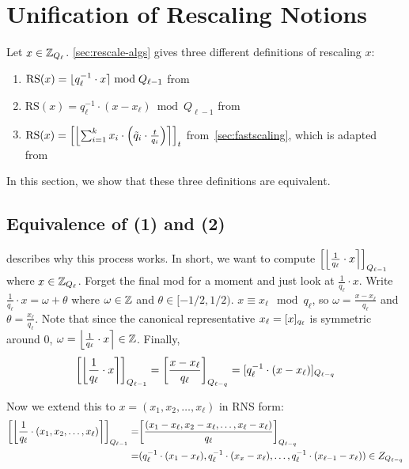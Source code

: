 \section{Unification of Rescaling Notions}
\label{sec:rescaleextras}

Let $x\in \Z_{Q_\ell}$. \cref{sec:rescale-algs} gives three different definitions of rescaling $x$:
\begin{enumerate}
	\item $\mathrm{RS}(x)=\round{q_\ell^{-1}\cdot x} \bmod Q_{\ell-1}$ from~\cite{cryptoeprint:2016/421, cryptoeprint:2018/153, cryptoeprint:2018/1043, cryptoeprint:2020/1118}
	\item $\mathrm{RS}(x)=q_\ell^{-1}\cdot (x-x_\ell)\bmod Q_{\ell-1}$ from~\cite{cryptoeprint:2018/931, cryptoeprint:2019/688}
	\item $\mathrm{RS}(x) = \bracks*{\round*{\sum_{i=1}^k x_i\cdot\parens*{\tilde{q}_i\cdot\frac{t}{q_i}}}}_t$ from~\cref{sec:fastscaling}, which is adapted from~\cite{cryptoeprint:2018/117}
\end{enumerate}

In this section, we show that these three definitions are equivalent.

\subsection{Equivalence of (1) and (2)}	
\cite{cryptoeprint:2015/1134} describes why this process works. In short, we want to compute $\bracks*{\round*{\frac{1}{q_\ell}\cdot x}}_{Q_{\ell-1}}$ where $x\in \Z_{Q_\ell}$. Forget the final mod for a moment and just look at $\frac{1}{q_\ell}\cdot x$. Write $\frac{1}{q_\ell}\cdot x = \omega + \theta$ where $\omega\in\Z$ and $\theta \in [-1/2, 1/2)$. $x \equiv x_\ell\mod q_\ell$, so $\omega = \frac{x-x_\ell}{q_\ell}$ and $\theta = \frac{x_\ell}{q_\ell}$. Note that since the canonical representative $x_\ell=\bracks{x}_{q_\ell}$ is symmetric around 0, $\omega = \round*{\frac{1}{q_\ell}\cdot x}\in\Z$. Finally, 
\[\bracks*{\round*{\frac{1}{q_\ell}\cdot x}}_{Q_{\ell-1}} = \bracks*{\frac{x-x_\ell}{q_\ell}}_{Q_{\ell-q}} =\bracks{q_\ell^{-1}\cdot(x-x_\ell)}_{Q_{\ell-q}}\]

Now we extend this to $x = (x_1, x_2, \ldots, x_\ell)$ in RNS form:
\begin{align}
	\bracks*{\round*{\frac{1}{q_\ell}\cdot (x_1, x_2, \ldots, x_\ell)}}_{Q_{\ell-1}} = & \bracks*{\frac{(x_1-x_\ell, x_2-x_\ell, \ldots, x_\ell-x_\ell)}{q_\ell}}_{Q_{\ell-q}} \\
	=& (q_\ell^{-1}\cdot(x_1-x_\ell), q_\ell^{-1}\cdot(x_x-x_\ell), \ldots, q_\ell^{-1}\cdot(x_{\ell-1}-x_\ell))\in Z_{Q_{\ell-q}}
\end{align}	

